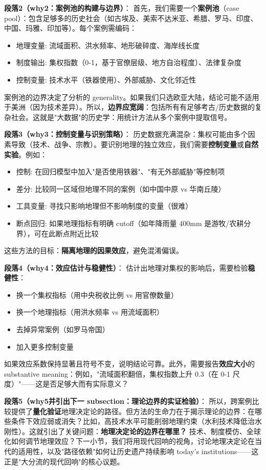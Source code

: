 \documentclass[../main.tex]{subfiles}
\begin{document}
\textbf{段落2（why2：案例池的构建与边界）}：  
首先，我们需要一个\textbf{案例池}（case pool）：包含足够多的历史社会（如古埃及、美索不达米亚、希腊、罗马、印度、中国、玛雅、印加等）。每个案例需编码：
\begin{itemize}
  \item 地理变量: 流域面积、洪水频率、地形破碎度、海岸线长度
  \item 制度输出: 集权指数（0-1，基于官僚层级、地方自治程度）、法律复杂度
  \item 控制变量: 技术水平（铁器使用）、外部威胁、文化邻近性
\end{itemize}
案例池的边界决定了分析的 generality。如果我们只选欧亚大陆，结论可能不适用于美洲（因为技术差异）。所以，\textbf{边界应宽阔}：包括所有有足够考古/历史数据的复杂社会。这就是"大数据"的历史学：用统计方法从多个案例中提取信号。

\textbf{段落3（why3：控制变量与识别策略）}：  
历史数据充满混杂：集权可能由多个因素导致（技术、战争、宗教）。要识别地理的独立效应，我们需要\textbf{控制变量}或\textbf{自然实验}。例如：
\begin{itemize}
  \item 控制: 在回归模型中加入"是否使用铁器"、"有无外部威胁"等控制项
  \item 差分: 比较同一区域但地理不同的案例（如中国中原 vs 华南丘陵）
  \item 工具变量: 寻找只影响地理但不影响制度的变量（很难）
  \item 断点回归: 如果地理指标有明确 cutoff（如年降雨量 400mm 是游牧/农耕分界），可在此断点附近比较
\end{itemize}
这些方法的目标：\textbf{隔离地理的因果效应}，避免混淆偏误。

\textbf{段落4（why4：效应估计与稳健性）}：  
估计出地理对集权的影响后，需要检验\textbf{稳健性}：
\begin{itemize}
  \item 换一个集权指标（用中央税收比例 vs 用官僚数量）
  \item 换一个地理指标（用洪水频率 vs 用流域面积）
  \item 去掉异常案例（如罗马帝国）
  \item 加入更多控制变量
\end{itemize}
如果效应系数保持显著且符号不变，说明结论可靠。此外，需要报告\textbf{效应大小}的 substantive meaning：例如，"流域面积翻倍，集权指数上升 0.3（在 0-1 尺度）"——这是否足够大而有实际意义？

\textbf{段落5（why5并引出下一 subsection：理论边界的实证检验）}：  
所以，跨案例比较提供了\textbf{量化验证}地理决定论的路径。但方法的生命力在于揭示理论的边界：在哪些条件下效应弱或消失？比如，高技术水平可能削弱地理约束（水利技术降低治水刚性）。这就引出了关键问题：\textbf{地理决定论的边界在哪里？} 技术、制度模仿、全球化如何调节地理效应？下一小节，我们将用现代回响的视角，讨论地理决定论在当代的适用性，以及"路径依赖"如何让历史遗产持续影响 today's institutions——这正是"大分流的现代回响"的核心议题。
	
\end{document}
